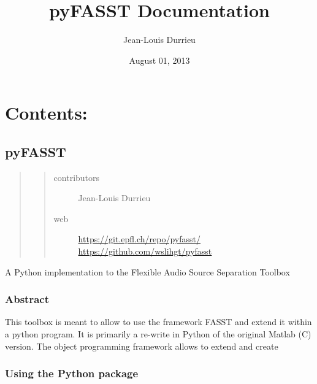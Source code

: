 \documentclass[letterpaper,10pt,english]{sphinxmanual}
\title{pyFASST Documentation}
\date{August 01, 2013}
\author{Jean-Louis Durrieu}
\begin{document}
\maketitle
\tableofcontents
{}\label{index::doc}



\chapter{Contents:}
\label{index:welcome-to-pyfasst-s-documentation}\label{index:contents}

\section{pyFASST}
\label{description:pyfasst}\label{description::doc}\begin{quote}
\begin{quote}\begin{description}
\item[{contributors}] \leavevmode
Jean-Louis Durrieu

\item[{web}] \leavevmode
\href{https://git.epfl.ch/repo/pyfasst/}{https://git.epfl.ch/repo/pyfasst/} \href{https://github.com/wslihgt/pyfasst}{https://github.com/wslihgt/pyfasst}

\end{description}\end{quote}
\end{quote}

A Python implementation to the Flexible Audio Source Separation Toolbox


\subsection{Abstract}
\label{description:abstract}
This toolbox is meant to allow to use the framework FASST and extend it within a python program. It is primarily a re-write in Python of the original Matlab (C) version. The object programming framework allows to extend and create


\subsection{Using the Python package}
\label{description:using-the-python-package}
\end{document}
